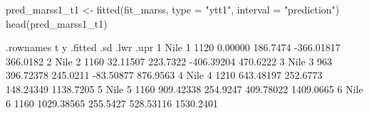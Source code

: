 \begin{Schunk}
\begin{Sinput}
 pred_marss1_t1 <- fitted(fit_marss, type = "ytt1", interval = "prediction")
 head(pred_marss1_t1)
\end{Sinput}
\begin{Soutput}
  .rownames t    y    .fitted      .sd       .lwr      .upr
1      Nile 1 1120    0.00000 186.7474 -366.01817  366.0182
2      Nile 2 1160   32.11507 223.7322 -406.39204  470.6222
3      Nile 3  963  396.72378 245.0211  -83.50877  876.9563
4      Nile 4 1210  643.48197 252.6773  148.24349 1138.7205
5      Nile 5 1160  909.42338 254.9247  409.78022 1409.0665
6      Nile 6 1160 1029.38565 255.5427  528.53116 1530.2401
\end{Soutput}
\end{Schunk}
